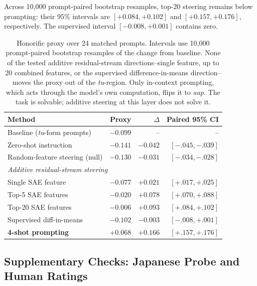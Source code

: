 \documentclass[11pt]{article}
\newcommand{\aap}{\textit{aap}}
\newcommand{\tu}{\textit{tu}}
\begin{document}
Across 10,000 prompt-paired bootstrap resamples, top-20 steering remains below
prompting: their 95\% intervals are $[+0.084,+0.102]$ and
$[+0.157,+0.176]$, respectively. The supervised interval
$[-0.008,+0.001]$ contains zero.

\begin{table}[t]
\centering
\scriptsize
\setlength\tabcolsep{2.5pt}
\begin{tabular}{lrrr}
\toprule
\textbf{Method} & \textbf{Proxy} & \textbf{$\Delta$} & \textbf{Paired 95\% CI} \\
\midrule
Baseline (\tu-form prompts)            & $-0.099$ & -- & -- \\
Zero-shot instruction                  & $-0.141$ & $-0.042$ & $[-.045,-.039]$ \\
Random-feature steering (null)         & $-0.130$ & $-0.031$ & $[-.034,-.028]$ \\
\midrule
\multicolumn{4}{l}{\emph{Additive residual-stream steering}}\\
\quad Single SAE feature               & $-0.077$ & $+0.021$ & $[+.017,+.025]$ \\
\quad Top-5 SAE features               & $-0.020$ & $+0.078$ & $[+.070,+.088]$ \\
\quad Top-20 SAE features              & $-0.006$ & $+0.093$ & $[+.084,+.102]$ \\
\quad Supervised diff-in-means         & $-0.102$ & $-0.003$ & $[-.008,+.001]$ \\
\midrule
\textbf{4-shot prompting}              & $\mathbf{+0.068}$ & $\mathbf{+0.166}$ & $\mathbf{[+.157,+.176]}$ \\
\bottomrule
\end{tabular}
\caption{Honorific proxy over 24 matched prompts. Intervals use 10,000
  prompt-paired bootstrap resamples of the change from baseline.
  None of the tested additive residual-stream directions--single feature, up to 20
  combined features, or the supervised difference-in-means direction--moves the
  proxy out of the \tu-region. Only in-context prompting, which acts through the
  model's own computation, flips it to \aap. The task is solvable; additive
  steering at this layer does not solve it.}
\label{tab:baselines}
\end{table}

\fi

\subsection{Supplementary Checks: Japanese Probe and Human Ratings}
\label{sec:supplementary}
\label{sec:japanese}
\label{sec:human-eval}
\end{document}
